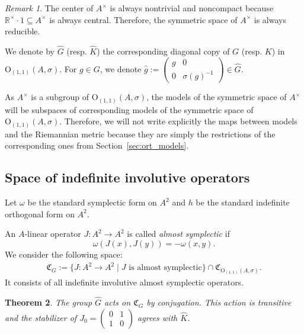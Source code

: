 \documentclass[oneside,11pt]{amsart}
\newtheorem{thm}{Theorem}[section]
\theoremstyle{definition}
\theoremstyle{remark}
\newtheorem{rem}[thm]{Remark}
\numberwithin{thm}{section}
\numberwithin{equation}{section}
\begin{document}
\begin{rem}
    The center of $A^\times$ is always nontrivial and  noncompact because $\mathbb R^\times\cdot 1\subseteq A^\times$ is always central. Therefore, the symmetric space of $A^\times$ is always reducible. 
\end{rem}

We denote by $\hat G$ (resp. $\hat K$) the corresponding diagonal copy of $G$ (resp. $K$) in $\mathrm{O}_{(1,1)}(A,\sigma)$. For $g\in G$, we denote $\hat g:=\begin{pmatrix}
    g & 0 \\
    0 & \sigma(g)^{-1}
\end{pmatrix}\in \hat G$.

As $A^\times$ is a subgroup of $\mathrm{O}_{(1,1)}(A,\sigma)$, the models of the symmetric space of $A^\times$ will be subspaces of corresponding models of the symmetric space of $\mathrm{O}_{(1,1)}(A,\sigma)$. Therefore, we will not write explicitly the maps between models and the Riemannian metric because they are simply the restrictions of the corresponding ones from Section~\ref{sec:ort_models}.

\subsection{Space of indefinite involutive operators}\label{sec:indefinite_A}


Let $\omega$ be the standard symplectic form on $A^2$ and $h$ be the standard indefinite orthogonal form on $A^2$.

An $A$-linear operator $J\colon A^2\to A^2$ is called \emph{almost symplectic} if 
$$
\omega(J(x),J(y))=-\omega(x,y).
$$
We consider the following space: 
\begin{align*}
\mathfrak{C}_G :=\{J\colon A^2\to A^2 \mid J\text{ is almost symplectic}\}\cap \mathfrak{C}_{\mathrm{O}_{(1,1)}(A,\sigma)}.
\end{align*}
It consists of all indefinite involutive almost symplectic operators.

\begin{thm}\label{thm:involaopermodel_A}
    The group $\hat G$ acts on $\mathfrak{C}_G$ by conjugation. This action is transitive and the stabilizer of $J_0=\begin{pmatrix}
        0 & 1 \\
        1 & 0
    \end{pmatrix}$
    agrees with $\hat K$.
\end{thm}
\end{document}
